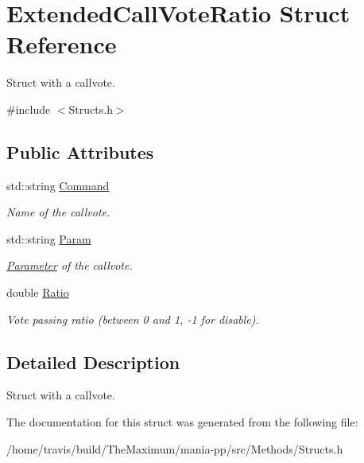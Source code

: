 \hypertarget{structExtendedCallVoteRatio}{\section{Extended\-Call\-Vote\-Ratio Struct Reference}
\label{structExtendedCallVoteRatio}
}


Struct with a callvote.  




{\ttfamily \#include $<$Structs.\-h$>$}

\subsection*{Public Attributes}
\begin{DoxyCompactItemize}
\item 
\hypertarget{structExtendedCallVoteRatio_a8b25c752447c968f2522c2748077b096}{std\-::string \hyperlink{structExtendedCallVoteRatio_a8b25c752447c968f2522c2748077b096}{Command}}\label{structExtendedCallVoteRatio_a8b25c752447c968f2522c2748077b096}

\begin{DoxyCompactList}\small\item\em Name of the callvote. \end{DoxyCompactList}\item 
\hypertarget{structExtendedCallVoteRatio_a2ed6da614783ad4f7e1f4376cc8b3b5a}{std\-::string \hyperlink{structExtendedCallVoteRatio_a2ed6da614783ad4f7e1f4376cc8b3b5a}{Param}}\label{structExtendedCallVoteRatio_a2ed6da614783ad4f7e1f4376cc8b3b5a}

\begin{DoxyCompactList}\small\item\em \hyperlink{structParameter}{Parameter} of the callvote. \end{DoxyCompactList}\item 
\hypertarget{structExtendedCallVoteRatio_a45f34354daff068af647554ada33f7f8}{double \hyperlink{structExtendedCallVoteRatio_a45f34354daff068af647554ada33f7f8}{Ratio}}\label{structExtendedCallVoteRatio_a45f34354daff068af647554ada33f7f8}

\begin{DoxyCompactList}\small\item\em Vote passing ratio (between 0 and 1, -\/1 for disable). \end{DoxyCompactList}\end{DoxyCompactItemize}


\subsection{Detailed Description}
Struct with a callvote. 

The documentation for this struct was generated from the following file\-:\begin{DoxyCompactItemize}
\item 
/home/travis/build/\-The\-Maximum/mania-\/pp/src/\-Methods/Structs.\-h\end{DoxyCompactItemize}
